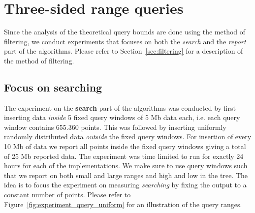 \documentclass[twoside,11pt,openright]{report}
\begin{document}
\clearpage

\section{Three-sided range queries}
Since the analysis of the theoretical query bounds are done using the method of filtering, we conduct experiments that focuses on both the \textit{search} and the \textit{report} part of the algorithms. Please refer to Section~\ref{sec:filtering} for a description of the method of filtering.

\subsection{Focus on searching}
The experiment on the \textbf{search} part of the algorithms was conducted by first inserting data \textit{inside} 5 fixed query windows of 5 Mb data each, i.e. each query window contains 655.360 points. This was followed by inserting uniformly randomly distributed data \textit{outside} the fixed query windows. For insertion of every 10 Mb of data we report all points inside the fixed query windows giving a total of 25 Mb reported data. The experiment was time limited to run for exactly 24 hours for each of the implementations. We make sure to use query windows such that we report on both small and large ranges and high and low in the tree. The idea is to focus the experiment on measuring \textit{searching} by fixing the output to a constant number of points. Please refer to Figure~\ref{fig:experiment_query_uniform} for an illustration of the query ranges.
\end{document}
